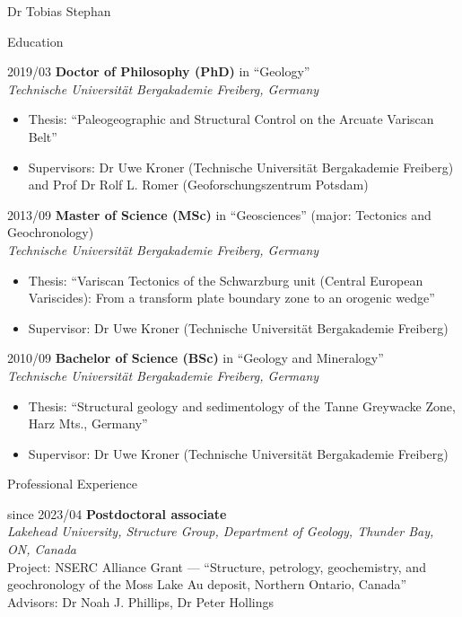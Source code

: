\documentclass[10pt, paper=letter]{scrartcl} %
\begin{document}
\begin{cv}{Dr Tobias Stephan}
\begin{cvlist}{Education}
    \item[2019/03] \textbf{Doctor of Philosophy (PhD)} in \enquote{Geology}\\ \textit{Technische Universit\"at Bergakademie Freiberg, Germany}
        \begin{itemize}\setlength\itemsep{-0.5em}
        \item Thesis: \enquote{Paleogeographic and Structural Control on the Arcuate Variscan Belt}
        \item Supervisors: Dr Uwe Kroner (Technische Universit\"at Bergakademie Freiberg) and Prof Dr Rolf L. Romer (Geoforschungszentrum Potsdam)
        \end{itemize}
    \item[2013/09] \textbf{Master of Science (MSc)} in \enquote{Geosciences} (major: Tectonics and Geochronology)\\
    \textit{Technische Universit\"at Bergakademie Freiberg, Germany}
        \begin{itemize}\setlength\itemsep{-0.5em}
        \item Thesis: \enquote{Variscan Tectonics of the Schwarzburg unit (Central European Variscides): From a transform plate boundary zone to an orogenic wedge}
        \item Supervisor: Dr Uwe Kroner (Technische Universit\"at Bergakademie Freiberg)
        \end{itemize}
    \item[2010/09] \textbf{Bachelor of Science (BSc)} in \enquote{Geology and Mineralogy}\\
    \textit{Technische Universit\"at Bergakademie Freiberg, Germany}
        \begin{itemize}\setlength\itemsep{-0.5em}
        \item Thesis: \enquote{Structural geology and sedimentology of the Tanne Greywacke Zone, Harz Mts., Germany}
        \item Supervisor: Dr Uwe Kroner (Technische Universit\"at Bergakademie Freiberg)
        \end{itemize}	 	
\end{cvlist}

\begin{cvlist}{Professional Experience}
\item[since 2023/04] \textbf{Postdoctoral associate}\\  \textit{Lakehead University, Structure Group, Department of Geology, Thunder Bay, ON, Canada}\\
Project: NSERC Alliance Grant --- \enquote{Structure, petrology, geochemistry, and geochronology of the Moss Lake Au deposit, Northern Ontario, Canada}\\
Advisors: Dr Noah J. Phillips, Dr Peter Hollings


\end{cvlist}
\end{cv}
\end{document}
